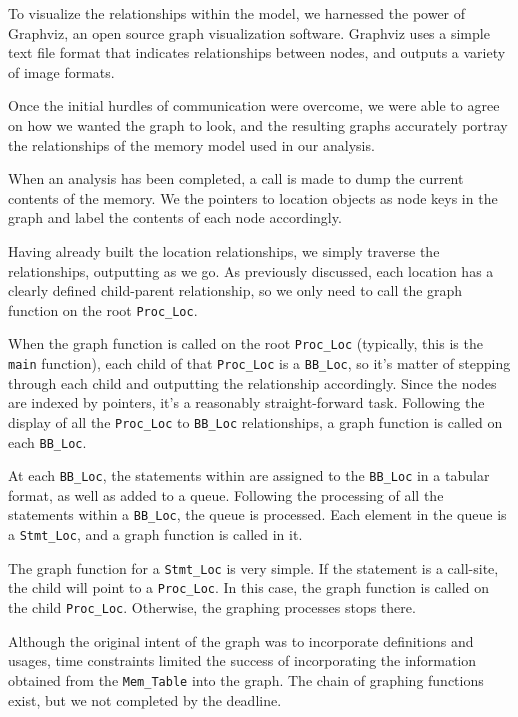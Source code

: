 To visualize the relationships within the model, we harnessed the power of
Graphviz, an open source graph visualization software. Graphviz uses a simple
text file format that indicates relationships between nodes, and outputs a
variety of image formats.\par
Once the initial hurdles of communication were overcome, we were able to agree
on how we wanted the graph to look, and the resulting graphs accurately portray
the relationships of the memory model used in our analysis.\par
When an analysis has been completed, a call is made to dump the current contents
of the memory. We the pointers to location objects as node keys in the graph and
label the contents of each node accordingly.\par
Having already built the location relationships, we simply traverse the
relationships, outputting as we go. As previously discussed, each location has a
clearly defined child-parent relationship, so we only need to call the graph
function on the root \texttt{Proc\_Loc}.\par
When the graph function is called on the root \texttt{Proc\_Loc} (typically, this
is the \texttt{main} function), each child of that \texttt{Proc\_Loc} is a
\texttt{BB\_Loc}, so it's matter of stepping through each child and outputting
the relationship accordingly. Since the nodes are indexed by pointers, it's a
reasonably straight-forward task. Following the display of all the
\texttt{Proc\_Loc} to \texttt{BB\_Loc} relationships, a graph function is called
on each \texttt{BB\_Loc}.\par
At each \texttt{BB\_Loc}, the statements within are assigned to the
\texttt{BB\_Loc} in a tabular format, as well as added to a queue. Following the
processing of all the statements within a \texttt{BB\_Loc}, the queue is
processed. Each element in the queue is a \texttt{Stmt\_Loc}, and a graph
function is called in it.\par
The graph function for a \texttt{Stmt\_Loc} is very simple. If the statement is a
call-site, the child will point to a \texttt{Proc\_Loc}. In this case, the graph
function is called on the child \texttt{Proc\_Loc}. Otherwise, the graphing
processes stops there.\par
Although the original intent of the graph was to incorporate definitions and
usages, time constraints limited the success of incorporating the information
obtained from the \texttt{Mem\_Table} into the graph. The chain of graphing
functions exist, but we not completed by the deadline.\par

